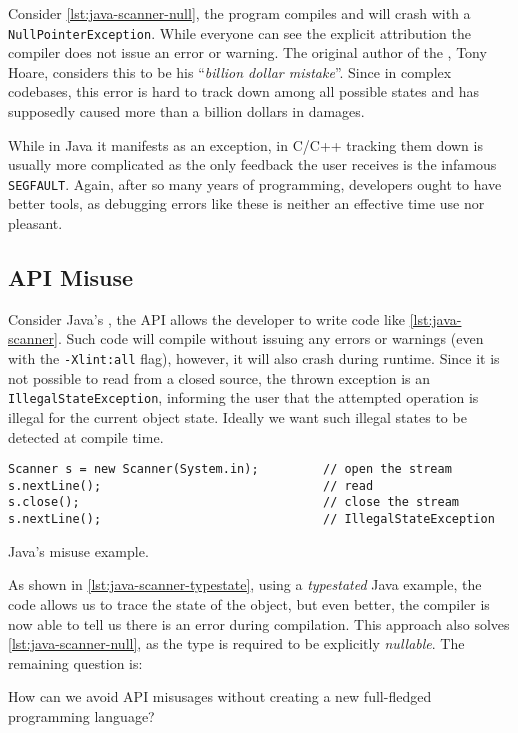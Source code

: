 Consider \autoref{lst:java-scanner-null}, the program compiles and will crash with a \texttt{NullPointerException}.
While everyone can see the explicit  attribution the compiler does not issue an error or warning.
The original author of the , Tony Hoare, considers this to be his “\emph{billion dollar mistake}”.
Since in complex codebases, this error is hard to track down among all possible states and
has supposedly caused more than a billion dollars in damages.

While in Java it manifests as an exception,
in C/C++ tracking them down is usually more complicated as the only feedback the user receives is the infamous \texttt{SEGFAULT}.
Again, after so many years of programming, developers ought to have better tools,
as debugging errors like these is neither an effective time use nor pleasant.

\subsection{API Misuse}

Consider Java's , the \gls{API} allows the developer to write code like \autoref{lst:java-scanner}.
Such code will compile without issuing any errors or warnings (even with the \texttt{-Xlint:all} flag),
however, it will also crash during runtime.
Since it is not possible to read from a closed source, the thrown exception is an \texttt{IllegalStateException},
informing the user that the attempted operation is illegal for the current object state.
Ideally we want such illegal states to be detected at compile time.

\begin{listing}
    \begin{verbatim}
Scanner s = new Scanner(System.in);         // open the stream
s.nextLine();                               // read
s.close();                                  // close the stream
s.nextLine();                               // IllegalStateException
    \end{verbatim}
    \caption{Java's  misuse example.}
    \label{lst:java-scanner}
\end{listing}

As shown in \autoref{lst:java-scanner-typestate}, using a \emph{typestated} Java example,
the code allows us to trace the state of the object, but even better,
the compiler is now able to tell us there is an error during compilation.
This approach also solves \autoref{lst:java-scanner-null}, as the type is required to be explicitly \emph{nullable}.
The remaining question is:
\begin{displayquote}
    How can we avoid \gls{API} misusages without creating a new full-fledged programming language?
\end{displayquote}


